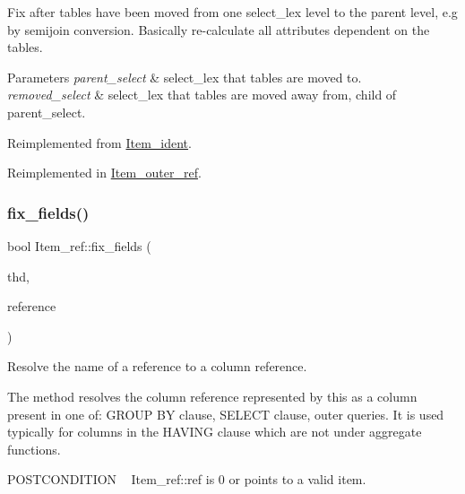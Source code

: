 Fix after tables have been moved from one select\+\_\+lex level to the parent level, e.\+g by semijoin conversion. Basically re-\/calculate all attributes dependent on the tables.


\begin{DoxyParams}{Parameters}
{\em parent\+\_\+select} & select\+\_\+lex that tables are moved to. \\
\hline
{\em removed\+\_\+select} & select\+\_\+lex that tables are moved away from, child of parent\+\_\+select. \\
\hline
\end{DoxyParams}


Reimplemented from \mbox{\hyperlink{classItem__ident_aef2c77c01832da121180c1a74d3873b5}{Item\+\_\+ident}}.



Reimplemented in \mbox{\hyperlink{classItem__outer__ref_a30ff5c4083f8d4d7c6ab5c7b2b4fac0c}{Item\+\_\+outer\+\_\+ref}}.

\mbox{\label{classItem__ref_a6a78e05b0db89e799f61808c621b808f}} 
\subsubsection{\texorpdfstring{fix\+\_\+fields()}{fix\_fields()}}
{\footnotesize\ttfamily bool Item\+\_\+ref\+::fix\+\_\+fields (\begin{DoxyParamCaption}\item[{T\+HD $\ast$}]{thd,  }\item[{\mbox{\hyperlink{classItem}{Item}} $\ast$$\ast$}]{reference }\end{DoxyParamCaption})\hspace{0.3cm}{\ttfamily [virtual]}}

Resolve the name of a reference to a column reference.

The method resolves the column reference represented by \textquotesingle{}this\textquotesingle{} as a column present in one of\+: G\+R\+O\+UP BY clause, S\+E\+L\+E\+CT clause, outer queries. It is used typically for columns in the H\+A\+V\+I\+NG clause which are not under aggregate functions.

P\+O\+S\+T\+C\+O\+N\+D\+I\+T\+I\+ON ~\newline
Item\+\_\+ref\+::ref is 0 or points to a valid item.

